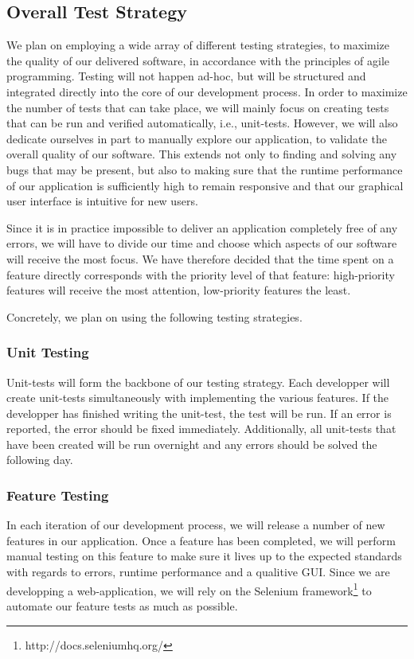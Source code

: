 \documentclass[10pt,a4paper,BCOR12mm, headexclude, footexclude,
  twoside, openright]{scrartcl}
\numberwithin{equation}{section} %
\numberwithin{figure}{section} %
\numberwithin{table}{section} %
\begin{document}
\subsection{Overall Test Strategy}
We plan on employing a wide array of different testing strategies, to maximize
the quality of our delivered software, in accordance with the principles of
agile programming. Testing will not happen ad-hoc, but will be structured and
integrated directly into the core of our development process.  In order to
maximize the number of tests that can take place, we will mainly focus on
creating tests that can be run and verified automatically, i.e., unit-tests.
However, we will also dedicate ourselves in part to manually explore our
application, to validate the overall quality of our software. This extends not
only to finding and solving any bugs that may be present, but also to making
sure that the runtime performance of our application is sufficiently high to
remain responsive and that our graphical user interface is intuitive for new
users.

Since it is in practice impossible to deliver an application completely free of
any errors, we will have to divide our time and choose which aspects of our
software will receive the most focus. We have therefore decided that the time
spent on a feature directly corresponds with the priority level of that feature:
high-priority features will receive the most attention, low-priority features
the least.

Concretely, we plan on using the following testing strategies.

\subsubsection*{Unit Testing}
Unit-tests will form the backbone of our testing strategy. Each developper will
create unit-tests simultaneously with implementing the various features.  If the
developper has finished writing the unit-test, the test will be run. If an error
is reported, the error should be fixed immediately.  Additionally, all
unit-tests that have been created will be run overnight and any errors should be
solved the following day.

\subsubsection*{Feature Testing}
In each iteration of our development process, we will release a number of new
features in our application. Once a feature has been completed, we will perform
manual testing on this feature to make sure it lives up to the expected
standards with regards to errors, runtime performance and a qualitive GUI.
Since we are developping a web-application, we will rely on the Selenium
framework\footnote{http://docs.seleniumhq.org/} to automate our feature tests as
much as possible.
\end{document}
